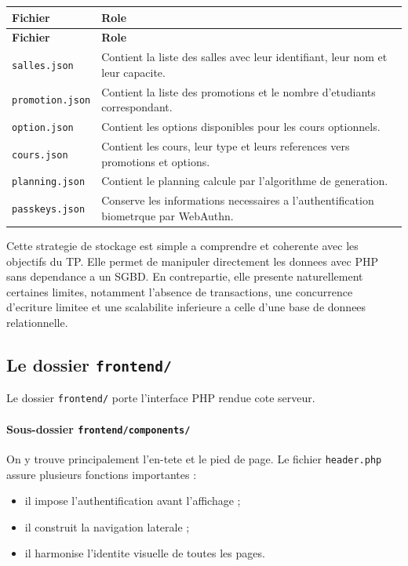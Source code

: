 \documentclass[12pt,a4paper]{article}
\begin{document}
\begin{longtable}{>{\raggedright\arraybackslash}p{} >{\raggedright\arraybackslash}p{}}
\toprule
\textbf{Fichier} & \textbf{Role} \\
\midrule
\endfirsthead
\toprule
\textbf{Fichier} & \textbf{Role} \\
\midrule
\endhead
\texttt{salles.json} & Contient la liste des salles avec leur identifiant, leur nom et leur capacite. \\
\texttt{promotion.json} & Contient la liste des promotions et le nombre d'etudiants correspondant. \\
\texttt{option.json} & Contient les options disponibles pour les cours optionnels. \\
\texttt{cours.json} & Contient les cours, leur type et leurs references vers promotions et options. \\
\texttt{planning.json} & Contient le planning calcule par l'algorithme de generation. \\
\texttt{passkeys.json} & Conserve les informations necessaires a l'authentification biometrque par WebAuthn. \\
\bottomrule
\end{longtable}

Cette strategie de stockage est simple a comprendre et coherente avec les objectifs du TP. Elle permet de manipuler directement les donnees avec PHP sans dependance a un SGBD. En contrepartie, elle presente naturellement certaines limites, notamment l'absence de transactions, une concurrence d'ecriture limitee et une scalabilite inferieure a celle d'une base de donnees relationnelle.

\subsection{Le dossier \texttt{frontend/}}
Le dossier \texttt{frontend/} porte l'interface PHP rendue cote serveur.

\paragraph{Sous-dossier \texttt{frontend/components/}}
On y trouve principalement l'en-tete et le pied de page. Le fichier \texttt{header.php} assure plusieurs fonctions importantes :
\begin{itemize}
    \item il impose l'authentification avant l'affichage ;
    \item il construit la navigation laterale ;
    \item il harmonise l'identite visuelle de toutes les pages.
\end{itemize}
\end{document}
